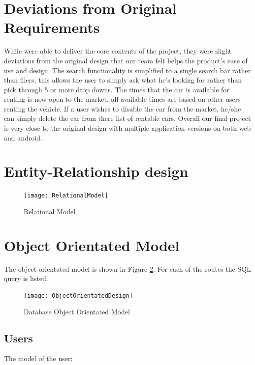 \documentclass{article}
\begin{document}
\section{Deviations from Original Requirements}
While were able to deliver the core contents of the project, they were slight deviations from the original design that
our team felt helps the product's ease of use and design. The search functionality is simplified to a single search bar rather than filers,
this allows the user to simply ask what he's looking for rather than pick through 5 or more drop downs. The times that the car is available for renting
is now open to the market, all available times are based on other users renting the vehicle. If a user wishes to disable the car from the market, he/she can
simply delete the car from there list of rentable cars. Overall our final project is very close to the original design with multiple application versions on both
web and android.

\section{Entity-Relationship design}
\begin{figure}[ht!]
    \centering
    \texttt{[image: RelationalModel]}
    \caption{Relational Model}
    \label{fig:relationalmodel}
\end{figure}

\section{Object Orientated Model}
The object orientated model is shown in Figure \ref{fig:oomodel}. For each of the
routes the SQL query is listed.
\begin{figure}[ht!]
    \centering
    \texttt{[image: ObjectOrientatedDesign]}
    \caption{Database Object Orientated Model}
    \label{fig:oomodel}
\end{figure}
\subsection{Users}
The model of the user:
\end{document}
